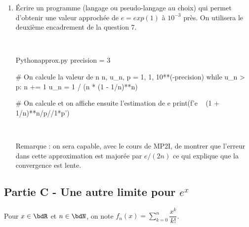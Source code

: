 \documentclass[a4paper,french,bookmarks]{article}
\begin{document}
\begin{enumerate}
    \item Écrire un programme (langage ou pseudo-langage au choix) qui permet d'obtenir une valeur approchée de $e = exp(1)$ à $10^{-3}$ près. On utilisera le deuxième encadrement de la question 7.
    
    \text{}\\[-12mm]
    \begin{code}{Python}{approx.py}
precision = 3
        
# On calcule la valeur de n
n, u_n, p = 1, 1, 10**(-precision)
while u_n > p:
    n += 1
    u_n = 1 / (n * (1 - 1/n)**n)

# On calcule et on affiche ensuite l'estimation de e
print(f'e ~ {(1 + 1/n)**n/p//1*p}')
    \end{code}
    \text{}\\[-12mm] 
    
    \begin{itshape}
        Remarque : on sera capable, avec le cours de MP2I, de montrer que l'erreur dans cette approximation est majorée par $e/(2n)$ ce qui explique que la convergence est lente.
    \end{itshape}

\end{enumerate}

\subsection*{Partie C - Une autre limite pour $e^x$}

Pour $x \in \bdR$ et $n \in \bdN$, on note $\displaystyle f_n(x)=\sum_{k=0}^n \dfrac{x^k}{k!}$.
\end{document}
